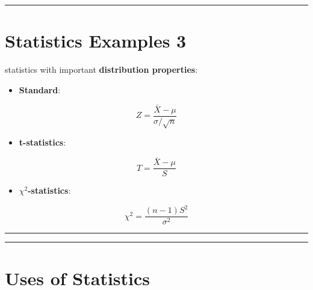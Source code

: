 \documentclass[
]{book}
\providecommand{\tightlist}{%
  \setlength{\itemsep}{0pt}\setlength{\parskip}{0pt}}
\begin{document}
\begin{center}\rule{0.5\linewidth}{0.5pt}\end{center}

\hypertarget{statistics-examples-3}{%
\section{Statistics Examples 3}\label{statistics-examples-3}}

statistics with important \textbf{distribution properties}:

\begin{itemize}
\tightlist
\item
  \textbf{Standard}:
\end{itemize}

\[Z=\frac{\bar{X}-\mu}{\sigma/\sqrt{n}}\]

\begin{itemize}
\tightlist
\item
  \textbf{t-statistics}:
\end{itemize}

\[T=\frac{\bar{X}-\mu}{S}\]

\begin{itemize}
\tightlist
\item
  \textbf{\(\chi^2\)-statistics}:
\end{itemize}

\[\chi^2=\frac{(n-1)S^2}{\sigma^2}\]

\begin{center}\rule{0.5\linewidth}{0.5pt}\end{center}

\begin{center}\rule{0.5\linewidth}{0.5pt}\end{center}

\hypertarget{uses-of-statistics}{%
\section{Uses of Statistics}\label{uses-of-statistics}}
\end{document}
